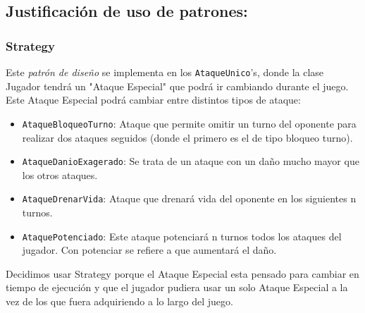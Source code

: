 \documentclass{article}
\newcommand{\code}[1]{\textcolor{white!25!black}{\texttt{#1}}}
\begin{document}
\newpage
\subsection*{Justificación de uso de patrones:}
\subsubsection*{Strategy}
Este \textit{patrón de diseño} se implementa en los \code{AtaqueUnico}'s, donde la clase Jugador tendrá un "Ataque Especial" que podrá ir cambiando durante el juego. Este Ataque Especial podrá cambiar entre distintos tipos de ataque:
\begin{itemize}
\item \code{AtaqueBloqueoTurno}: Ataque que permite omitir un turno del oponente para realizar dos ataques seguidos (donde el primero es el de tipo bloqueo turno).

\item \code{AtaqueDanioExagerado}: Se trata de un ataque con un daño mucho mayor que los otros ataques.

\item \code{AtaqueDrenarVida}: Ataque que drenará vida del oponente en los siguientes n turnos.

\item \code{AtaquePotenciado}: Este ataque potenciará n turnos todos los ataques del jugador. Con potenciar se refiere a que aumentará el daño.

\end{itemize}

Decidimos usar Strategy porque el Ataque Especial esta pensado para cambiar en tiempo de ejecución y que el jugador pudiera usar un solo Ataque Especial a la vez de los que fuera adquiriendo a lo largo del juego.
\end{document}

